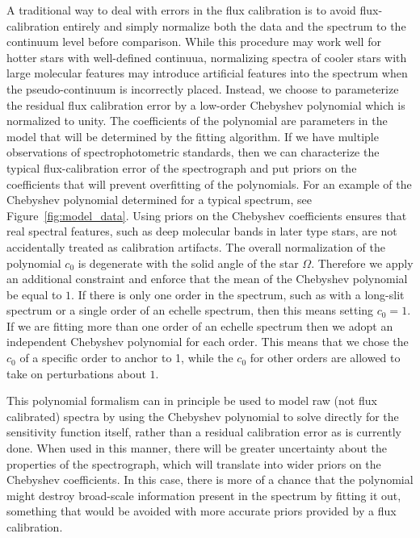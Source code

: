 \documentclass[preprint]{aastex} %
\begin{document}
A traditional way to deal with errors in the flux calibration is to avoid flux-calibration entirely and simply normalize both the data and the spectrum to the continuum level before comparison.  While this procedure may work well for hotter stars with well-defined continuua, normalizing spectra of cooler stars with large molecular features may introduce artificial features into the spectrum when the pseudo-continuum is incorrectly placed.  Instead, we choose to parameterize the residual flux calibration error by a low-order Chebyshev polynomial which is normalized to unity. The coefficients of the polynomial are parameters in the model that will be determined by the fitting algorithm. If we have multiple observations of spectrophotometric standards, then we can characterize the typical flux-calibration error of the spectrograph and put priors on the coefficients that will prevent overfitting of the polynomials.  For an example of the Chebyshev polynomial determined for a typical spectrum, see Figure~\ref{fig:model_data}. Using priors on the Chebyshev coefficients ensures that real spectral features, such as deep molecular bands in later type stars, are not accidentally treated as calibration artifacts. The overall normalization of the polynomial $c_0$ is degenerate with the solid angle of the star $\Omega$. Therefore we apply an additional constraint and enforce that the mean of the Chebyshev polynomial be equal to $1$. If there is only one order in the spectrum, such as with a long-slit spectrum or a single order of an echelle spectrum, then this means setting $c_0 = 1$. If we are fitting more than one order of an echelle spectrum then we adopt an independent Chebyshev polynomial for each order. This means that we chose the $c_0$ of a specific order to anchor to 1, while the $c_0$ for other orders are allowed to take on perturbations about $1$. 

This polynomial formalism can in principle be used to model raw (not flux calibrated) spectra by using the Chebyshev polynomial to solve directly for the sensitivity function itself, rather than a residual calibration error as is currently done. When used in this manner, there will be greater uncertainty about the properties of the spectrograph, which will translate into wider priors on the Chebyshev coefficients.  In this case, there is more of a chance that the polynomial might destroy broad-scale information present in the spectrum by fitting it out, something that would be avoided with more accurate priors provided by a flux calibration.
\end{document}
